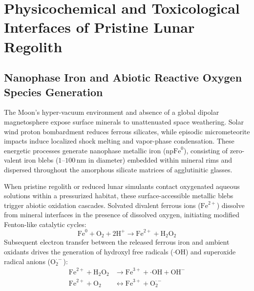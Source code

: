 \section{Physicochemical and Toxicological Interfaces of Pristine Lunar Regolith}
\label{sec:toxicology}

\subsection{Nanophase Iron and Abiotic Reactive Oxygen Species Generation}
\label{subsec:npfe_ros}

The Moon's hyper-vacuum environment and absence of a global dipolar magnetosphere expose surface minerals to unattenuated space weathering\cite{paul2022plants,ming1989lunar,hendrix2024reactivity,turci2015mechanistic}. Solar wind proton bombardment reduces ferrous silicates, while episodic micrometeorite impacts induce localized shock melting and vapor-phase condensation\cite{ming1989lunar,liu2013microwave}. These energetic processes generate nanophase metallic iron ($\mathrm{npFe}^0$), consisting of zero-valent iron blebs ($1\text{--}100\,\mathrm{nm}$ in diameter) embedded within mineral rims and dispersed throughout the amorphous silicate matrices of agglutinitic glasses\cite{paul2022plants,ming1989lunar,krejci2026lunar}.

When pristine regolith or reduced lunar simulants contact oxygenated aqueous solutions within a pressurized habitat, these surface-accessible metallic blebs trigger abiotic oxidation cascades\cite{ming1989lunar,hendrix2024reactivity,turci2015mechanistic}. Solvated divalent ferrous ions ($\mathrm{Fe}^{2+}$) dissolve from mineral interfaces in the presence of dissolved oxygen, initiating modified Fenton-like catalytic cycles\cite{ming1989lunar,hendrix2024reactivity,turci2015mechanistic}:
\begin{equation}
    \mathrm{Fe}^0 + \mathrm{O}_2 + 2\mathrm{H}^+ \longrightarrow \mathrm{Fe}^{2+} + \mathrm{H}_2\mathrm{O}_2
    \label{eq:fe0_dissolution}
\end{equation}
Subsequent electron transfer between the released ferrous iron and ambient oxidants drives the generation of hydroxyl free radicals ($\cdot\mathrm{OH}$) and superoxide radical anions ($\mathrm{O}_2^{\cdot-}$):
\begin{align}
    \mathrm{Fe}^{2+} + \mathrm{H}_2\mathrm{O}_2 &\longrightarrow \mathrm{Fe}^{3+} + \cdot\mathrm{OH} + \mathrm{OH}^- \label{eq:fenton_reaction} \\
    \mathrm{Fe}^{2+} + \mathrm{O}_2 &\longleftrightarrow \mathrm{Fe}^{3+} + \mathrm{O}_2^{\cdot-} \label{eq:superoxide_reaction}
\end{align}

